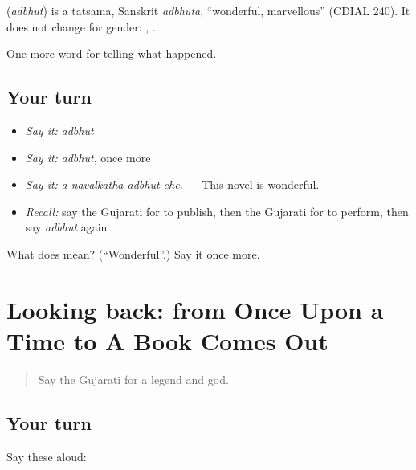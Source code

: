 \begin{cousinweb}
\textbf{} (\emph{adbhut}) is a tatsama, Sanskrit \emph{adbhuta}, \textquotedblleft{}wonderful, marvellous\textquotedblright{} (CDIAL 240). It does not change for gender: \textbf{ }, \textbf{ }.
\end{cousinweb}

\begin{grammarlens}[title={What you've built}]
One more word for telling what happened.
\end{grammarlens}

\subsection*{Your turn}
\begin{itemize}
\raggedright
  \item \emph{Say it:} \emph{adbhut}
  \item \emph{Say it:} \emph{adbhut}, once more
  \item \emph{Say it:} \emph{ā navalkathā adbhut che.} — This novel is wonderful.
  \item \emph{Recall:} say the Gujarati for to publish, then the Gujarati for to perform, then say \emph{adbhut} again
\end{itemize}

\begin{tcolorbox}[breakable,colback=teal!4,colframe=teal!35!black,title={Before you move on}]
What does  mean? (\textquotedblleft{}Wonderful\textquotedblright{}.) Say it once more.
\end{tcolorbox}
\section[(dialogue)]{Looking back: from Once Upon a Time to A Book Comes Out}

\label{lesson:GU-R338-review-332-338}



\begin{quote}
Say the Gujarati for a legend and god.
\end{quote}

\subsection*{Your turn}
Say these aloud:

